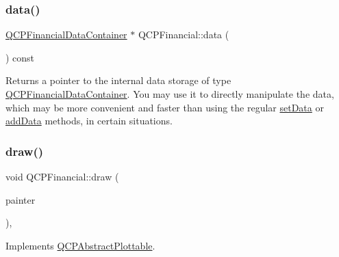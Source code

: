 \mbox{\label{class_q_c_p_financial_aec3f666271cf48bd7b87d84fe3f8c074}} 
\subsubsection{\texorpdfstring{data()}{data()}}
{\footnotesize\ttfamily \hyperlink{qcustomplot_8h_ae36e482e04f19a54782f01ab38c354a6}{Q\+C\+P\+Financial\+Data\+Container} $\ast$ Q\+C\+P\+Financial\+::data (\begin{DoxyParamCaption}{ }\end{DoxyParamCaption}) const\hspace{0.3cm}{\ttfamily [inline]}}

Returns a pointer to the internal data storage of type \hyperlink{qcustomplot_8h_ae36e482e04f19a54782f01ab38c354a6}{Q\+C\+P\+Financial\+Data\+Container}. You may use it to directly manipulate the data, which may be more convenient and faster than using the regular \hyperlink{class_q_c_p_financial_a72089e75b8a50d18097526c3c79fdb85}{set\+Data} or \hyperlink{class_q_c_p_financial_a372ac031e44a7a6c912d203556af96f7}{add\+Data} methods, in certain situations. \mbox{\label{class_q_c_p_financial_a4d62b7a618d609321adb5f5f1e31f446}} 
\subsubsection{\texorpdfstring{draw()}{draw()}}
{\footnotesize\ttfamily void Q\+C\+P\+Financial\+::draw (\begin{DoxyParamCaption}\item[{\hyperlink{class_q_c_p_painter}{Q\+C\+P\+Painter} $\ast$}]{painter }\end{DoxyParamCaption})\hspace{0.3cm}{\ttfamily [protected]}, {\ttfamily [virtual]}}



Implements \hyperlink{class_q_c_p_abstract_plottable_a453f676a5cee7bf846c5f0fa05ea84b3}{Q\+C\+P\+Abstract\+Plottable}.

\mbox{\label{class_q_c_p_financial_ade6b703369d8acb3bfa0b8e244df4b06}} 

